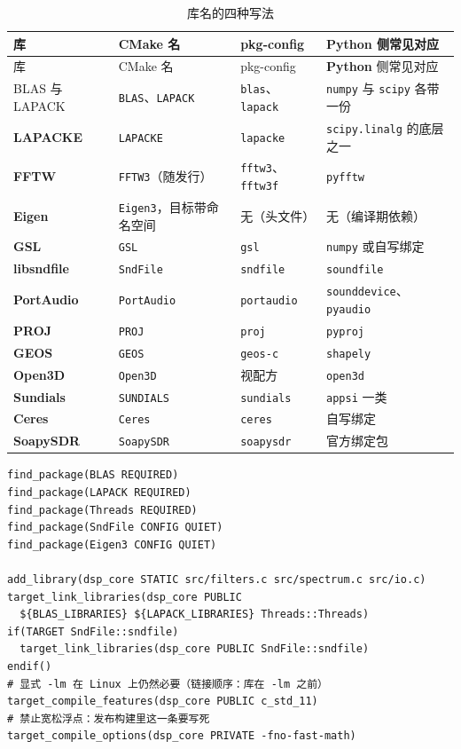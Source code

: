 \documentclass[12pt,a4paper,fontset=fandol]{ctexbook}
\newcommand{\Tp}[1]{\texttt{#1}}
\newcommand{\Lib}[1]{\textbf{#1}}
\newcommand{\Lang}[1]{\textsf{\bfseries #1}}
\newcommand{\PY}{\Lang{Python}}
\begin{document}
\begin{longtable}{@{}>{\raggedright\arraybackslash}p{}
  >{\raggedright\arraybackslash}p{}
  >{\raggedright\arraybackslash}p{}
  >{\raggedright\arraybackslash}p{}@{}}
\caption{库名的四种写法}\label{tab:apB-names}\\
\toprule
库 & CMake 名 & pkg-config & \PY{} 侧常见对应 \\
\midrule
\endfirsthead
\toprule
库 & CMake 名 & pkg-config & \PY{} 侧常见对应 \\
\midrule
\endhead
BLAS 与 LAPACK & \Tp{BLAS}、\Tp{LAPACK} &
  \Tp{blas}、\Tp{lapack} &
  \Tp{numpy} 与 \Tp{scipy} 各带一份 \\
\Lib{LAPACKE} & \Tp{LAPACKE} & \Tp{lapacke} &
  \Tp{scipy.linalg} 的底层之一 \\
\Lib{FFTW} & \Tp{FFTW3}（随发行） & \Tp{fftw3}、\Tp{fftw3f} &
  \Tp{pyfftw} \\
\Lib{Eigen} & \Tp{Eigen3}，目标带命名空间 &
  无（头文件） & 无（编译期依赖） \\
\Lib{GSL} & \Tp{GSL} & \Tp{gsl} & \Tp{numpy} 或自写绑定 \\
\Lib{libsndfile} & \Tp{SndFile} & \Tp{sndfile} & \Tp{soundfile} \\
\Lib{PortAudio} & \Tp{PortAudio} & \Tp{portaudio} &
  \Tp{sounddevice}、\Tp{pyaudio} \\
\Lib{PROJ} & \Tp{PROJ} & \Tp{proj} & \Tp{pyproj} \\
\Lib{GEOS} & \Tp{GEOS} & \Tp{geos-c} & \Tp{shapely} \\
\Lib{Open3D} & \Tp{Open3D} & 视配方 & \Tp{open3d} \\
\Lib{Sundials} & \Tp{SUNDIALS} & \Tp{sundials} & \Tp{appsi} 一类 \\
\Lib{Ceres} & \Tp{Ceres} & \Tp{ceres} & 自写绑定 \\
\Lib{SoapySDR} & \Tp{SoapySDR} & \Tp{soapysdr} & 官方绑定包 \\
\end{longtable}

\begin{lstlisting}[style=cmakestyle,caption={把这一域的常见依赖接在一起：显式线程库与显式数学库}]
find_package(BLAS REQUIRED)
find_package(LAPACK REQUIRED)
find_package(Threads REQUIRED)
find_package(SndFile CONFIG QUIET)
find_package(Eigen3 CONFIG QUIET)

add_library(dsp_core STATIC src/filters.c src/spectrum.c src/io.c)
target_link_libraries(dsp_core PUBLIC
  ${BLAS_LIBRARIES} ${LAPACK_LIBRARIES} Threads::Threads)
if(TARGET SndFile::sndfile)
  target_link_libraries(dsp_core PUBLIC SndFile::sndfile)
endif()
# 显式 -lm 在 Linux 上仍然必要（链接顺序：库在 -lm 之前）
target_compile_features(dsp_core PUBLIC c_std_11)
# 禁止宽松浮点：发布构建里这一条要写死
target_compile_options(dsp_core PRIVATE -fno-fast-math)
\end{lstlisting}
\end{document}
